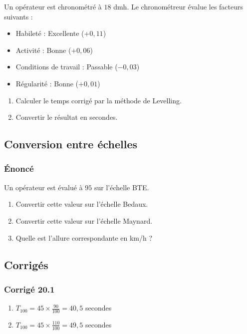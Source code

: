 \documentclass[a4paper,12pt]{article}
\begin{document}
Un opérateur est chronométré à $18$ dmh. Le chronométreur évalue les facteurs suivants :

\begin{itemize}
    \item Habileté : Excellente ($+0,11$)
    \item Activité : Bonne ($+0,06$)
    \item Conditions de travail : Passable ($-0,03$)
    \item Régularité : Bonne ($+0,01$)
\end{itemize}

\begin{enumerate}
    \item Calculer le temps corrigé par la méthode de Levelling.
    \item Convertir le résultat en secondes.
\end{enumerate}

\subsection{Conversion entre échelles}

\subsubsection*{Énoncé}

Un opérateur est évalué à $95$ sur l'échelle BTE.

\begin{enumerate}
    \item Convertir cette valeur sur l'échelle Bedaux.
    \item Convertir cette valeur sur l'échelle Maynard.
    \item Quelle est l'allure correspondante en km/h ?
\end{enumerate}

\subsection{Corrigés}

\subsubsection*{Corrigé 20.1}

\begin{enumerate}
    \item $T_{100} = 45 \times \frac{90}{100} = 40,5$ secondes
    \item $T_{100} = 45 \times \frac{110}{100} = 49,5$ secondes
\end{enumerate}
\end{document}
